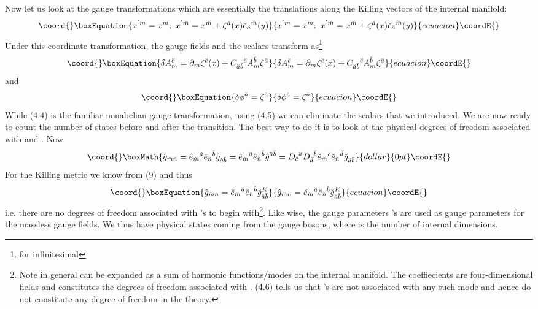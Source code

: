 \documentclass[a4paper,12pt]{article}
\begin{document}
Now let us look at the gauge transformations which are essentially the translations along the Killing vectors of the internal manifold:
\begin{equation}\coord{}\boxEquation{
x^{'m}=x^m;\ x^{'\ms}=x^{\ms}+\ze^{\as}(x)\es_{\as}{}^{\ms}(y)
}{
x^{'m}=x^m;\ x^{'\ms}=x^{\ms}+\ze^{\as}(x)\es_{\as}{}^{\ms}(y)
}{ecuacion}\coordE{}\end{equation}
Under this coordinate transformation, the gauge fields and the scalars transform as\footnote{for  infinitesimal \myHighlight{$\ze$}\coordHE{}}
\begin{equation}\coord{}\boxEquation{
\de A_m^{\cs}=\p_m\ze^{\cs}(x)+C_{\as\bs}{}^{\cs}A_m^{\bs}\ze^{\as}
}{
\de A_m^{\cs}=\p_m\ze^{\cs}(x)+C_{\as\bs}{}^{\cs}A_m^{\bs}\ze^{\as}
}{ecuacion}\coordE{}\end{equation}
and
\begin{equation}\coord{}\boxEquation{
\de \phi^{\as}=\ze^{\as}
}{
\de \phi^{\as}=\ze^{\as}
}{ecuacion}\coordE{}\end{equation}
While (4.4) is the familiar nonabelian gauge transformation, using (4.5) we can eliminate the scalars that we introduced. We are now ready to count the number of states before and after the transition. The best way to do it is to look at the physical degrees of freedom associated with \coordHE{} and \coordHE{}. Now
$$\coord{}\boxMath{
\hat{g}_{\ms\ns}=\eh_{\ms}{}^{\ah}\eh_{\ns}{}^{\bh}\hat{g}_{\ah\bh}=\eh_{\ms}{}^{\as}\eh_{\ns}{}^{\bs}\hat{g}^{\as\bs}=D_{\cs}{}^{\as}D_{\ds}{}^{\bs}\es_{\ms}{}^{\cs}\es_{\ns}{}^{\ds}\breve{g}_{\as\bs}}{dollar}{0pt}\coordE{}$$
For the Killing metric we know from (9) \coordHE{} and thus
\begin{equation}\coord{}\boxEquation{
\hat{g}_{\ms\ns}=\es_{\ms}{}^{\as}\es_{\ns}{}^{\bs}\breve{g}^K_{\as\bs}
}{
\hat{g}_{\ms\ns}=\es_{\ms}{}^{\as}\es_{\ns}{}^{\bs}\breve{g}^K_{\as\bs}
}{ecuacion}\coordE{}\end{equation}
i.e. there are no  degrees of freedom associated with \myHighlight{$\phi$}\coordHE{}'s to begin with\footnote{Note in general \coordHE{} can be expanded as a sum of harmonic functions/modes on the internal manifold. The coeffiecients are four-dimensional fields and constitutes the degrees of freedom associated with \coordHE{}. (4.6) tells us that \myHighlight{$\phi$}\coordHE{}'s are not associated with any such mode and hence do not constitute any degree of freedom in the theory.}. Like wise, the gauge parameters \myHighlight{$\ze^{\as}$}\coordHE{}'s are used as gauge parameters for the massless \coordHE{} gauge fields. We thus have \coordHE{} physical states coming from the gauge bosons, where \coordHE{} is the number of internal dimensions. 
\end{document}
